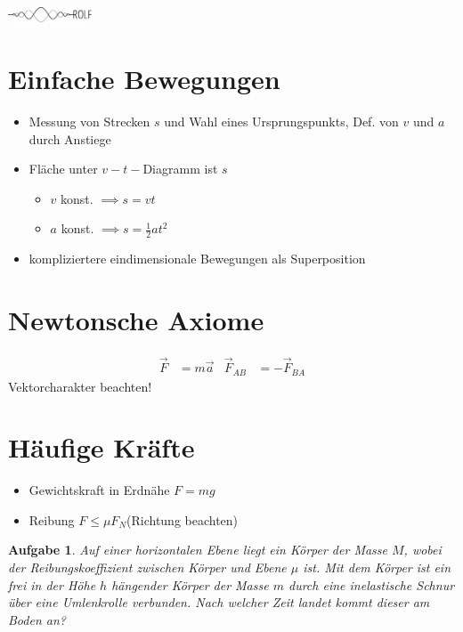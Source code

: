 \documentclass[a4paper,12pt]{extarticle}
\theoremstyle{problemstyle}
\newtheorem{problem}{Aufgabe}
\begin{document}

\begin{multicols}{2}
\parbox{2.5cm}{\includegraphics[width=2.5cm]{../task/images/logo_scaled.pdf}}
\parbox{4.5cm}{}
\section*{Einfache Bewegungen}
\begin{itemize}
\item Messung von Strecken $s$ und Wahl eines Ursprungspunkts, Def. von $v$ und $a$ durch Anstiege
\item Fläche unter $v-t-$Diagramm ist $s$
\begin{itemize}
\item $v$ konst. $\implies s=vt$
\item $a$ konst. $\implies s=\frac{1}{2}at^2$
\end{itemize}
\item kompliziertere eindimensionale Bewegungen als Superposition
\end{itemize}
\section*{Newtonsche Axiome}
\begin{align}
\vec{F} &= m \vec{a} & \vec{F}_{AB} &=-\vec{F}_{BA}
\end{align}
Vektorcharakter beachten!
\section*{Häufige Kräfte}
\begin{itemize}
\item Gewichtskraft in Erdnähe $F=mg$
\item Reibung $F\leq \mu F_N$(Richtung beachten)
\end{itemize}
\begin{problem}
Auf einer horizontalen Ebene liegt ein Körper der Masse $M$, wobei der Reibungskoeffizient zwischen Körper und Ebene $\mu$ ist. Mit dem Körper ist ein frei in der Höhe $h$ hängender Körper der Masse $m$ durch eine inelastische Schnur über eine Umlenkrolle verbunden. Nach welcher Zeit landet kommt dieser am Boden an?  
\end{problem}

\end{multicols}
\end{document}
